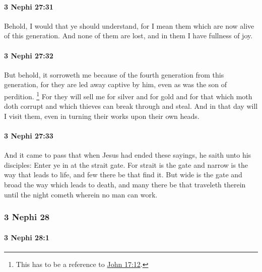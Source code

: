 		\paragraph{3 Nephi 27:31} %
			\label{3NEPHI-27-31}

			Behold, I would that ye should understand,
			for I mean them which are now alive of this generation.
			And none of them are lost,
			and in them I have fullness of joy.

		\paragraph{3 Nephi 27:32} %
			\label{3NEPHI-27-32}

			But behold, it sorroweth me
			because of the fourth generation from this generation,
			for they are led away captive by him,
			even as was the son of perdition.%
				\footnote{%
					This has to be a reference to \hyperref[JOHN-17-12]{John 17:12}.
					}
			For they will sell me for silver and for gold
			and for that which moth doth corrupt
			and which thieves can break through and steal.
			And in that day will I visit them,
			even in turning their works upon their own heads.

		\paragraph{3 Nephi 27:33} %
			\label{3NEPHI-27-33}

			And it came to pass that when Jesus had ended these sayings,
			he saith unto his disciples:
			Enter ye in at the strait gate.
			For strait is the gate and narrow is the way that leads to life,
			and few there be that find it.
			But wide is the gate and broad the way which leads to death,
			and many there be that traveleth therein
			until the night cometh wherein no man can work.

	\subsubsection{3 Nephi 28} %
		\label{3NEPHI-28}
		
		\paragraph{3 Nephi 28:1} %
			\label{3NEPHI-28-1}

